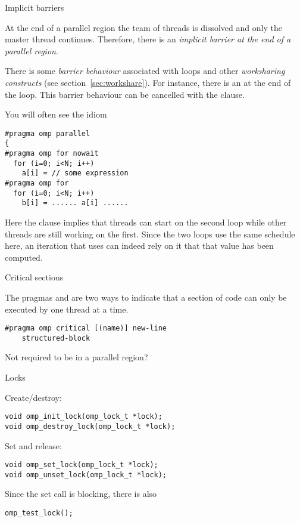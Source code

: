  {Implicit barriers}

At the end of a parallel region the team of threads is dissolved and
only the master thread continues. Therefore, there is an
\emph{implicit barrier at the end of a parallel region}.

There is some \emph{barrier behaviour} associated with  loops and other
\emph{worksharing constructs} (see section~\ref{sec:workshare}).  For instance, there
is an  at the end of the loop. This
barrier behaviour can be cancelled with the 
clause.

You will often see the idiom
\begin{verbatim}
#pragma omp parallel
{
#pragma omp for nowait
  for (i=0; i<N; i++)
    a[i] = // some expression
#pragma omp for
  for (i=0; i<N; i++)
    b[i] = ...... a[i] ......
\end{verbatim}
Here the  clause implies that threads can start on the second loop
while other threads are still working on the first. Since the two loops use the same
schedule here, an iteration that uses  can indeed rely on it that that 
value has been computed.

 {Critical sections}

The pragmas  and 
are two ways to indicate that a section of code can only be executed
by one thread at a time.

\begin{verbatim}
#pragma omp critical [(name)] new-line
    structured-block
\end{verbatim}

Not required to be in a parallel region?

 {Locks}
\label{ompref:locks}

Create/destroy:
\begin{verbatim}
void omp_init_lock(omp_lock_t *lock);
void omp_destroy_lock(omp_lock_t *lock);
\end{verbatim}
Set and release:
\begin{verbatim}
void omp_set_lock(omp_lock_t *lock);
void omp_unset_lock(omp_lock_t *lock);
\end{verbatim}
Since the set call is blocking, there is also 
\begin{verbatim}
omp_test_lock();
\end{verbatim}

